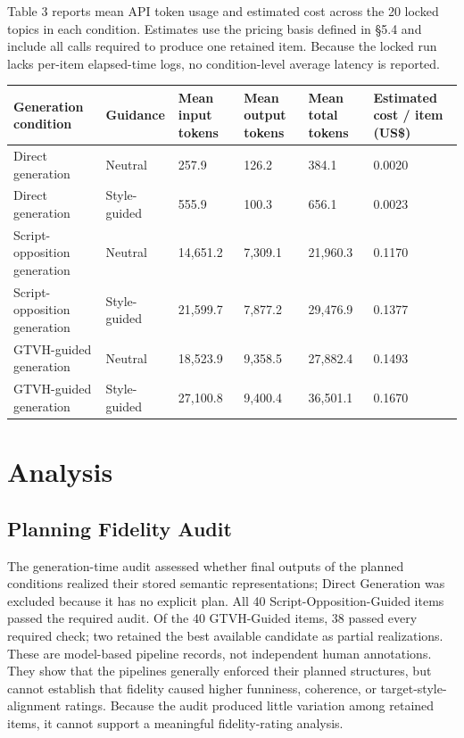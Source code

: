 \documentclass[11pt]{article}
\begin{document}
Table 3 reports mean API token usage and estimated cost across the 20 locked topics in each condition. Estimates use the pricing basis defined in §5.4 and include all calls required to produce one retained item. Because the locked run lacks per-item elapsed-time logs, no condition-level average latency is reported.

\begin{table}[t]\centering\scriptsize\begin{tabularx}{\textwidth}{YYYYYY}
\toprule\noalign{}
Generation condition & Guidance & Mean input tokens & Mean output tokens & Mean total tokens & Estimated cost / item (US\$) \\
\midrule\noalign{}

\bottomrule\noalign{}

Direct generation & Neutral & 257.9 & 126.2 & 384.1 & 0.0020 \\
Direct generation & Style-guided & 555.9 & 100.3 & 656.1 & 0.0023 \\
Script-opposition generation & Neutral & 14,651.2 & 7,309.1 & 21,960.3 & 0.1170 \\
Script-opposition generation & Style-guided & 21,599.7 & 7,877.2 & 29,476.9 & 0.1377 \\
GTVH-guided generation & Neutral & 18,523.9 & 9,358.5 & 27,882.4 & 0.1493 \\
GTVH-guided generation & Style-guided & 27,100.8 & 9,400.4 & 36,501.1 & 0.1670 \\
\end{tabularx}\end{table}

\section{Analysis}\label{analysis}

\subsection{Planning Fidelity Audit}\label{planning-fidelity-audit}

The generation-time audit assessed whether final outputs of the planned conditions realized their stored semantic representations; Direct Generation was excluded because it has no explicit plan. All 40 Script-Opposition-Guided items passed the required audit. Of the 40 GTVH-Guided items, 38 passed every required check; two retained the best available candidate as partial realizations. These are model-based pipeline records, not independent human annotations. They show that the pipelines generally enforced their planned structures, but cannot establish that fidelity caused higher funniness, coherence, or target-style-alignment ratings. Because the audit produced little variation among retained items, it cannot support a meaningful fidelity-rating analysis.
\end{document}
